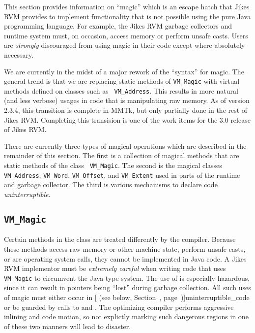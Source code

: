 This section provides information on ``magic'' which is an escape
hatch that Jikes\TMweb{} RVM provides to implement functionality that
is not possible using the pure Java\TMweb{} programming language.  For
example, the Jikes RVM garbage collectors and runtime system must, on
occasion, access memory or perform unsafe casts.  Users are {\it
strongly} discouraged from using magic in their code except where
absolutely necessary.

We are currently in the midst of a major rework of the ``syntax'' for
magic. The general trend is that we are replacing static methods of
{\tt VM\_Magic} with virtual methods defined on classes such as {\tt
VM\_Address}. This results in more natural (and less verbose) usages
in code that is manipulating raw memory. As of version 2.3.4, this
transition is complete in MMTk, but only partially done in the rest of
Jikes RVM. Completing this transision is one of the work items for the
3.0 release of Jikes RVM. 

There are currently three types of magical operations which are
described in the remainder of this section.  
%
The first is a collection
of magical methods that are static methods of the class {\tt
VM\_Magic}.  
%
The second is the magical classes 
{\tt VM\_Address}, 
{\tt VM\_Word}, 
{\tt VM\_Offset}, and 
{\tt VM\_Extent} used in parts of the 
runtime and garbage collector.
%
The third is various mechanisms to declare code {\em uninterruptible}.

\subsection{\texttt{VM\_Magic}}%
%
%
Certain methods in the class  are
treated differently by the compiler. Because these methods access raw
memory or other machine state, perform unsafe casts, or are operating
system calls, they cannot be implemented in Java code.  A
Jikes\TMweb{} RVM implementor must be {\em extremely careful} when
writing code that uses {\tt VM\_Magic} to circumvent the Java type
system.  The use of  is especially hazardous, since it can
result in pointers being ``lost'' during garbage collection.  All such
uses of magic must either occur in [
(see below, Section~\Ref, page~\Pageref)]{uninterruptible_code}
or be guarded by calls to  and .
The optimizing compiler performs aggressive inlining and code motion, so
not explictly marking such dangerous regions in one of these two
manners will lead to disaster.

